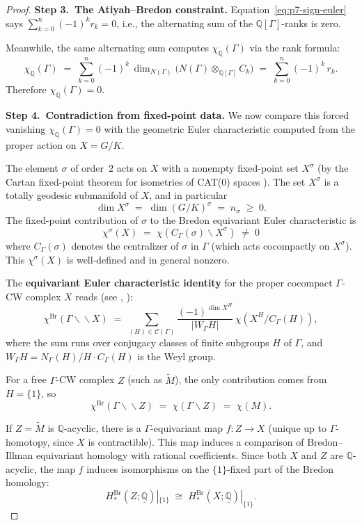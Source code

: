 \begin{proof}
\textbf{Step 3.\ The Atiyah--Bredon constraint.}
Equation~\eqref{eq:p7-sign-euler} says
$\sum_{k=0}^n (-1)^k r_k = 0$, i.e., the alternating sum of the
$\mathbb{Q}[\Gamma]$-ranks is zero.

Meanwhile, the same alternating sum computes
$\chi_\mathbb{Q}(\Gamma)$ via the rank formula:
\[
  \chi_\mathbb{Q}(\Gamma)
  \;=\;
  \sum_{k=0}^n (-1)^k\,
  \dim_{N(\Gamma)}\bigl(N(\Gamma)\otimes_{\mathbb{Q}[\Gamma]} C_k\bigr)
  \;=\;
  \sum_{k=0}^n (-1)^k\, r_k.
\]
Therefore $\chi_\mathbb{Q}(\Gamma) = 0$.

\textbf{Step 4.\ Contradiction from fixed-point data.}
We now compare this forced vanishing $\chi_\mathbb{Q}(\Gamma)=0$ with the
geometric Euler characteristic computed from the proper action on
$X = G/K$.

The element $\sigma$ of order~$2$ acts on $X$ with a nonempty fixed-point set
$X^\sigma$ (by the Cartan fixed-point theorem for isometries of CAT(0) spaces
\cite{BridsonHaefliger}). The set $X^\sigma$ is a totally geodesic
submanifold of $X$, and in particular
\[
  \dim X^\sigma \;=\; \dim(G/K)^\sigma \;=\; n_\sigma \;\ge\; 0.
\]
The fixed-point contribution of $\sigma$ to the Bredon equivariant Euler
characteristic is
\[
  \chi^\sigma(X)
  \;=\;
  \chi(C_\Gamma(\sigma)\backslash X^\sigma)
  \;\ne\; 0
\]
where $C_\Gamma(\sigma)$ denotes the centralizer of $\sigma$ in $\Gamma$
(which acts cocompactly on $X^\sigma$). This $\chi^\sigma(X)$ is
well-defined and in general nonzero.

The \textbf{equivariant Euler characteristic identity} for the proper
cocompact $\Gamma$-CW complex $X$ reads (see \cite[Thm.\,6.80]{LuckBook},
\cite{LuckRosenberg03}):
\begin{equation}
\label{eq:p7-equiv-euler}
\chi^{\mathrm{Br}}(\Gamma\backslash\!\backslash X)
\;=\;
\sum_{(H)\in\mathcal{C}(\Gamma)}
  \frac{(-1)^{\dim X^H}}{|W_\Gamma H|}\,\chi(X^H/C_\Gamma(H)),
\end{equation}
where the sum runs over conjugacy classes of finite subgroups $H$ of $\Gamma$,
and $W_\Gamma H = N_\Gamma(H)/H\cdot C_\Gamma(H)$ is the Weyl group.

For a free $\Gamma$-CW complex $Z$ (such as $\widetilde{M}$), the only
contribution comes from $H=\{1\}$, so
\[
  \chi^{\mathrm{Br}}(\Gamma\backslash\!\backslash Z)
  \;=\; \chi(\Gamma\backslash Z)
  \;=\; \chi(M).
\]

If $Z = \widetilde{M}$ is $\mathbb{Q}$-acyclic, there is a
$\Gamma$-equivariant map $f: Z \to X$ (unique up to $\Gamma$-homotopy, since
$X$ is contractible). This map induces a comparison of Bredon--Illman
equivariant homology with rational coefficients. Since both $X$ and $Z$ are
$\mathbb{Q}$-acyclic, the map $f$ induces isomorphisms on the $\{1\}$-fixed
part of the Bredon homology:
\[
  H_*^{\mathrm{Br}}(Z;\underline{\mathbb{Q}})|_{\{1\}}
  \;\cong\;
  H_*^{\mathrm{Br}}(X;\underline{\mathbb{Q}})|_{\{1\}}.
\]


\end{proof}
